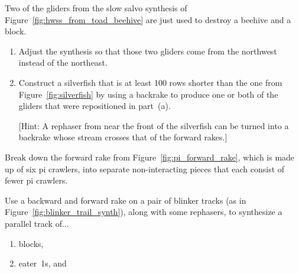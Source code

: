 \begin{multicols}{2}
	
	\begin{problem}\label{exer:silverfish_backward_glider_destroy}
		Two of the gliders from the slow salvo synthesis of Figure~\ref{fig:hwss_from_toad_beehive} are just used to destroy a beehive and a block.
		
		\begin{enumerate}[label=\bf\color{ocre}(\alph*)]
			\item Adjust the synthesis so that those two gliders come from the northwest instead of the northeast.
			
			\item Construct a silverfish that is at least 100 rows shorter than the one from Figure~\ref{fig:silverfish} by using a backrake to produce one or both of the gliders that were repositioned in part~(a).
			
			[Hint: A rephaser from near the front of the silverfish can be turned into a backrake whose stream crosses that of the forward rakes.]
		\end{enumerate}
	\end{problem}
	
	
	\mfilbreak
	
	
	\begin{problem}\label{exer:pi_forward_rake_break_apart}
		Break down the forward rake from Figure~\ref{fig:pi_forward_rake}, which is made up of six pi crawlers, into separate non-interacting pieces that each consist of fewer pi crawlers.
	\end{problem}


	\mfilbreak
	
	
	\begin{problem}\label{exer:two_pi_tracks_synth_objects}
		Use a backward and forward rake on a pair of blinker tracks (as in Figure~\ref{fig:blinker_trail_synth}), along with some rephasers, to synthesize a parallel track of...
		
		\begin{enumerate}[label=\bf\color{ocre}(\alph*)]
			\item blocks,
			
			\item eater~1s, and
			

\end{enumerate}
\end{problem}
\end{multicols}
